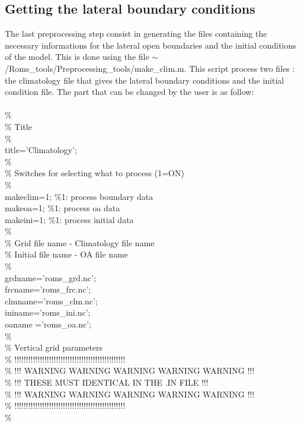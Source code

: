 \subsection{Getting the lateral boundary conditions}

The last preprocessing step consist in generating the files containing 
the necessary informations for the lateral open boundaries and the initial
conditions of the model. 
This is done using the file $\sim$/Roms\_tools/Preprocessing\_tools/make\_clim.m.
This script process two files : the climatology file that gives the lateral
boundary conditions and the initial condition file.
The part that can be changed by the user is as follow:
\\ \\
\%\\
\%  Title \\
\%\\
title='Climatology';\\
\%\\
\%  Switches for selecting what to process (1=ON)\\
\%\\
makeclim=1; \%1: process boundary data\\
makeoa=1;   \%1: process oa data\\
makeini=1;  \%1: process initial data\\
\%\\
\%  Grid file name - Climatology file name\\
\%  Initial file name - OA file name\\
\%\\
grdname='roms\_grd.nc';\\
frcname='roms\_frc.nc';\\
clmname='roms\_clm.nc';\\
ininame='roms\_ini.nc';\\
oaname ='roms\_oa.nc';\\
\%\\
\%  Vertical grid parameters\\
\%  !!!!!!!!!!!!!!!!!!!!!!!!!!!!!!!!!!!!!!!!!!!!!!!!\\
\%  !!! WARNING WARNING WARNING WARNING WARNING  !!!\\
\%  !!!   THESE MUST IDENTICAL IN THE .IN FILE   !!!\\
\%  !!! WARNING WARNING WARNING WARNING WARNING  !!!\\
\%  !!!!!!!!!!!!!!!!!!!!!!!!!!!!!!!!!!!!!!!!!!!!!!!!\\
\%\\

